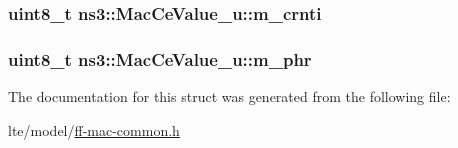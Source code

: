 \subsubsection[{\texorpdfstring{m\+\_\+crnti}{m_crnti}}]{\setlength{\rightskip}{0pt plus 5cm}uint8\+\_\+t ns3\+::\+Mac\+Ce\+Value\+\_\+u\+::m\+\_\+crnti}\hypertarget{structns3_1_1MacCeValue__u_aa8c2e4e1bdc174ac3670612c15d880b7}{}\label{structns3_1_1MacCeValue__u_aa8c2e4e1bdc174ac3670612c15d880b7}
\subsubsection[{\texorpdfstring{m\+\_\+phr}{m_phr}}]{\setlength{\rightskip}{0pt plus 5cm}uint8\+\_\+t ns3\+::\+Mac\+Ce\+Value\+\_\+u\+::m\+\_\+phr}\hypertarget{structns3_1_1MacCeValue__u_ad5ac5b7e1390356c0f0ea4a52589b9fd}{}\label{structns3_1_1MacCeValue__u_ad5ac5b7e1390356c0f0ea4a52589b9fd}


The documentation for this struct was generated from the following file\+:\begin{DoxyCompactItemize}
\item 
lte/model/\hyperlink{ff-mac-common_8h}{ff-\/mac-\/common.\+h}\end{DoxyCompactItemize}
